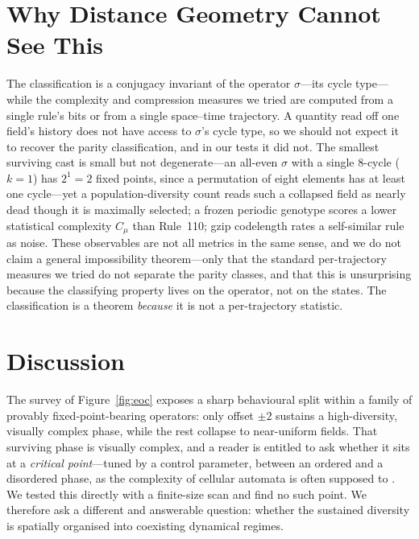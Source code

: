 \documentclass[man,12pt,floatsintext]{apa7}
\newcommand{\sig}{\sigma}
\begin{document}
\section{Why Distance Geometry Cannot See This}
\label{sec:metrics}

The classification is a conjugacy invariant of the operator $\sig$---its
cycle type---while the complexity and compression measures we tried are
computed from a single rule's bits or from a single space--time trajectory. A
quantity read off one field's history does not have access to $\sig$'s cycle
type, so we should not expect it to recover the parity classification, and in
our tests it did not. The smallest surviving cast is small but not
degenerate---an all-even $\sig$ with a single $8$-cycle ($k=1$) has
$2^1 = 2$ fixed points, since a permutation of eight elements has at least one
cycle---yet a population-diversity count reads such a collapsed field as
nearly dead though it is maximally selected; a frozen periodic genotype scores
a lower statistical complexity $C_\mu$ \parencite{crutchfield1989inferring}
than Rule~110; gzip codelength rates a self-similar rule as noise. These
observables are not all metrics in the same sense, and we do not claim a
general impossibility theorem---only that the standard per-trajectory measures
we tried do not separate the parity classes, and that this is unsurprising
because the classifying property lives on the operator, not on the states.
The classification is a theorem \emph{because} it is not a per-trajectory
statistic.

\section{Discussion}
\label{sec:discussion}

The survey of Figure~\ref{fig:eoc} exposes a sharp behavioural split within a
family of provably fixed-point-bearing operators: only offset $\pm 2$ sustains a
high-diversity, visually complex phase, while the rest collapse to near-uniform
fields. That surviving phase is visually complex, and a reader is entitled to ask whether
it sits at a \emph{critical point}---tuned by a control parameter, between an
ordered and a disordered phase, as the complexity of cellular automata is often
supposed to \parencite{langton1990computation}. We tested this directly with a
finite-size scan and find no such point. We therefore ask a
different and answerable question: whether the sustained diversity is spatially
organised into coexisting dynamical regimes.
\end{document}

